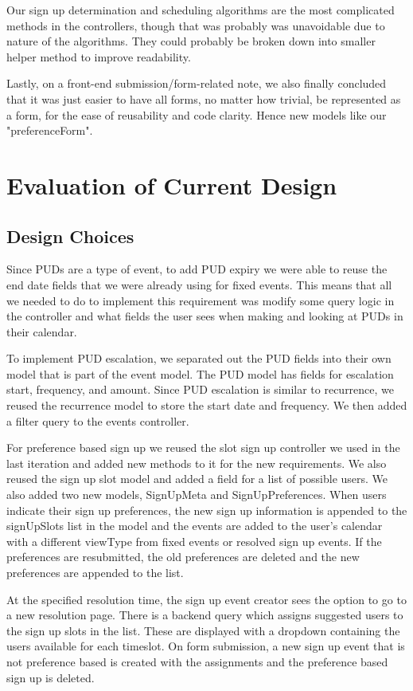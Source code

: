 \documentclass{article}
\begin{document}
Our sign up determination and scheduling algorithms are the most complicated methods in the controllers, though that was probably was unavoidable due to nature of the algorithms. They could probably be broken down into smaller helper method to improve readability.

Lastly, on a front-end submission/form-related note, we also finally concluded that it was just easier to have all forms, no matter how trivial, be represented as a form, for the ease of reusability and code clarity. Hence new models like our "preferenceForm".

\section{Evaluation of Current Design}
\subsection{Design Choices}
Since PUDs are a type of event, to add PUD expiry we were able to reuse the end date fields that we were already using for fixed events.  This means that all we needed to do to implement this requirement was modify some query logic in the controller and what fields the user sees when making and looking at PUDs in their calendar.
    
To implement PUD escalation, we separated out the PUD fields into their own model that is part of the event model.  The PUD model has fields for escalation start, frequency, and amount.  Since PUD escalation is similar to recurrence, we reused the recurrence model to store the start date and frequency.  We then added a filter query to the events controller.
    
For preference based sign up we reused the slot sign up controller we used in the last iteration and added new methods to it for the new requirements.  We also reused the sign up slot model and added a field for a list of possible users.  We also added two new models, SignUpMeta and SignUpPreferences.  When users indicate their sign up preferences, the new sign up information is appended to the signUpSlots list in the model and the events are added to the user's calendar with a different viewType from fixed events or resolved sign up events.  If the preferences are resubmitted, the old preferences are deleted and the new preferences are appended to the list.  

At the specified resolution time, the sign up event creator sees the option to go to a new resolution page.  There is a backend query which assigns suggested users to the sign up slots in the list.  These are displayed with a dropdown containing the users available for each timeslot.  On form submission, a new sign up event that is not preference based is created with the assignments and the preference based sign up is deleted.
\end{document}

